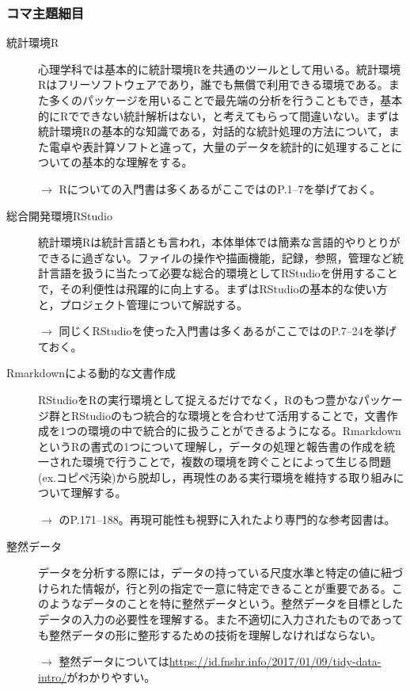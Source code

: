 \subsubsection{コマ主題細目}
\begin{description}
\item[統計環境R] 心理学科では基本的に統計環境Rを共通のツールとして用いる。統計環境Rはフリーソフトウェアであり，誰でも無償で利用できる環境である。また多くのパッケージを用いることで最先端の分析を行うこともでき，基本的にRでできない統計解析はない，と考えてもらって間違いない。まずは統計環境Rの基本的な知識である，対話的な統計処理の方法について，また電卓や表計算ソフトと違って，大量のデータを統計的に処理することについての基本的な理解をする。
\begin{flushright}
    $\to$ Rについての入門書は多くあるがここでは\citet{kosugi2019}のP.1--7を挙げておく。
\end{flushright}
\item[総合開発環境RStudio]統計環境Rは統計言語とも言われ，本体単体では簡素な言語的やりとりができるに過ぎない。ファイルの操作や描画機能，記録，参照，管理など統計言語を扱うに当たって必要な総合的環境としてRStudioを併用することで，その利便性は飛躍的に向上する。まずはRStudioの基本的な使い方と，プロジェクト管理について解説する。
\begin{flushright}
    $\to$ 同じくRStudioを使った入門書は多くあるがここでは\citet{kosugi2019}のP.7--24を挙げておく。
\end{flushright}

\item[Rmarkdownによる動的な文書作成]RStudioをRの実行環境として捉えるだけでなく，Rのもつ豊かなパッケージ群とRStudioのもつ統合的な環境とを合わせて活用することで，文書作成を1つの環境の中で統合的に扱うことができるようになる。RmarkdownというRの書式の1つについて理解し，データの処理と報告書の作成を統一された環境で行うことで，複数の環境を跨ぐことによって生じる問題(ex.コピペ汚染)から脱却し，再現性のある実行環境を維持する取り組みについて理解する。
\begin{flushright}
    $\to$ \citet{kosugi2019}のP.171--188。再現可能性も視野に入れたより専門的な参考図書は\citet{高橋201805}。
\end{flushright}

\item[整然データ]データを分析する際には，データの持っている尺度水準と特定の値に紐づけられた情報が，行と列の指定で一意に特定できることが重要である。このようなデータのことを特に整然データという。整然データを目標としたデータの入力の必要性を理解する。また不適切に入力されたものであっても整然データの形に整形するための技術を理解しなければならない。
\begin{flushright}
    $\to$ 整然データについては\url{https://id.fnshr.info/2017/01/09/tidy-data-intro/}がわかりやすい。
\end{flushright}


\end{description}
